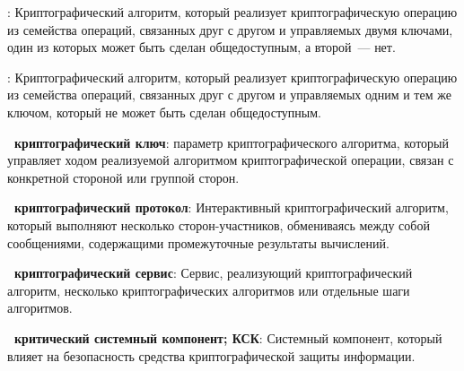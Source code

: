 

:
Криптографический алгоритм, который реализует криптографическую
операцию из семейства операций, связанных друг с другом и управляемых двумя 
ключами, один из которых может быть сделан общедоступным, а второй~--- нет.

:
Криптографический алгоритм, который реализует криптографическую
операцию из семейства операций, связанных друг с другом и управляемых одним и 
тем же ключом, который не может быть сделан общедоступным.  

{\bf \thedefctr~криптографический ключ}: 
 параметр криптографического алгоритма, который управляет 
ходом реализуемой алгоритмом криптографической операции, связан с конкретной 
стороной или группой сторон.



{\bf \thedefctr~криптографический протокол}:
Интерактивный криптографический алгоритм, который выполняют 
несколько сторон-участников, обмениваясь между собой сообщениями,
содержащими промежуточные результаты вычислений. 

{\bf \thedefctr~криптографический сервис}:
Сервис, реализующий криптографический алгоритм, 
несколько криптографических алгоритмов или отдельные шаги алгоритмов.

{\bf \thedefctr~критический системный компонент; КСК}:
Системный компонент, который влияет на безопасность средства криптографической 
защиты информации.

